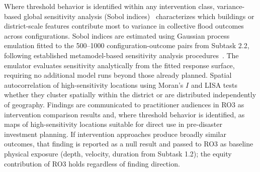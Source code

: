 \documentclass[11pt]{article}
\begin{document}
Where threshold behavior is identified within any intervention class,
variance-based global sensitivity analysis (Sobol indices)~\cite{saltelli2010variance}
characterizes which buildings or district-scale features contribute most to variance
in collective flood outcomes across configurations.
Sobol indices are estimated using Gaussian process emulation fitted to the
500--1000 configuration-outcome pairs from Subtask 2.2, following established
metamodel-based sensitivity analysis procedures~\cite{saltelli2010variance,marrel2009calculations}.
The emulator evaluates sensitivity analytically from the fitted response surface,
requiring no additional model runs beyond those already planned.
Spatial autocorrelation of high-sensitivity locations using Moran's $I$ and LISA
tests whether they cluster spatially within the district or are distributed
independently of geography.
Findings are communicated to practitioner audiences in RO3 as intervention
comparison results and, where threshold behavior is identified, as maps of
high-sensitivity locations suitable for direct use in pre-disaster investment
planning.
If intervention approaches produce broadly similar outcomes, that finding is
reported as a null result and passed to RO3 as baseline physical exposure
(depth, velocity, duration from Subtask 1.2); the equity contribution of RO3
holds regardless of finding direction.
\end{document}
